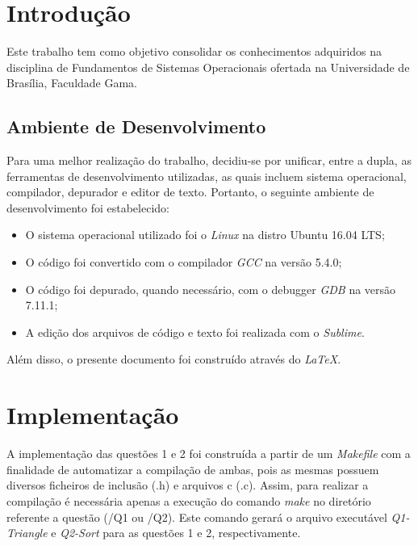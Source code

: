 \chapter[Introdução]{Introdução}

	Este trabalho tem como objetivo consolidar os conhecimentos adquiridos na disciplina de Fundamentos de Sistemas
	Operacionais ofertada na Universidade de Brasília, Faculdade Gama.

\section{Ambiente de Desenvolvimento}

	Para uma melhor realização do trabalho, decidiu-se por unificar, entre a dupla, as ferramentas de desenvolvimento
	utilizadas, as quais incluem sistema operacional, compilador, depurador e editor de texto. Portanto, o seguinte
	ambiente de desenvolvimento foi estabelecido:

	\begin{itemize}

		\item O sistema operacional utilizado foi o \textit{Linux} na distro Ubuntu 16.04 LTS;
		\item O código foi convertido com o compilador \textit{GCC} na versão 5.4.0;
		\item O código foi depurado, quando necessário, com o debugger \textit{GDB} na versão 7.11.1;
		\item A edição dos arquivos de código e texto foi realizada com o \textit{Sublime}.

	\end{itemize}

	Além disso, o presente documento foi construído através do \textit{LaTeX}.

	\chapter[Implementação]{Implementação}

  A implementação das questões 1 e 2 foi construída a partir de um \textit{Makefile} com a finalidade de automatizar a
  compilação de ambas, pois as mesmas possuem diversos ficheiros de inclusão (.h) e arquivos c (.c). Assim, para
  realizar a compilação é necessária apenas a execução do comando \textit{make} no diretório referente a questão
  (/Q1 ou /Q2). Este comando gerará o arquivo executável \textit{Q1-Triangle} e \textit{Q2-Sort} para as questões 1 e 2,
  respectivamente.

